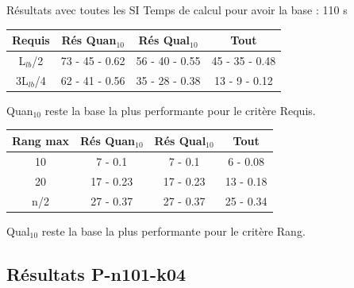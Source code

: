 \documentclass{beamer}
\begin{document}
\begin{frame}{Résultats avec toutes les SI}
Temps de calcul pour avoir la base : 110 s

\centering
\begin{tabular}{|c|c|c|c|}
   \hline
   Requis & Rés Quan$_{10}$ & Rés Qual$_{10}$ & Tout \\
   \hline
   L$_{lb}$/2 & 73 - 45 - 0.62 & 56 - 40 - 0.55 & 45 - 35 - 0.48 \\
   \hline
   3L$_{lb}$/4 & 62 - 41 - 0.56 & 35 - 28 - 0.38  & 13 - 9 - 0.12 \\
   \hline
\end{tabular}

Quan$_{10}$ reste la base la plus performante pour le critère Requis.

\begin{tabular}{|c|c|c|c|}
   \hline
   Rang max & Rés Quan$_{10}$ & Rés Qual$_{10}$ & Tout \\
   \hline
   10 & 7 - 0.1 & 7 - 0.1 & 6 - 0.08 \\
   \hline
   20 & 17 - 0.23 & 17 - 0.23 & 13 - 0.18 \\
   \hline
   n/2 & 27 - 0.37 & 27 - 0.37 & 25 - 0.34 \\
   \hline
\end{tabular}

Qual$_{10}$ reste la base la plus performante pour le critère Rang.
\end{frame}


\subsection{Résultats P-n101-k04}
\end{document}
